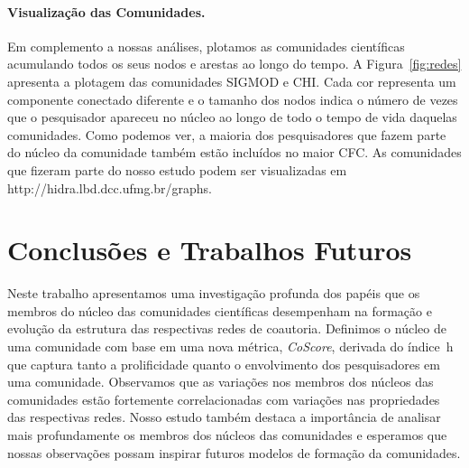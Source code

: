 \documentclass[12pt]{article}
\begin{document}
\paragraph{Visualização das Comunidades.} 
Em complemento a nossas análises, plotamos as comunidades científicas acumulando todos os seus nodos e arestas ao longo 
do tempo. A Figura~\ref{fig:redes} apresenta a plotagem das comunidades SIGMOD e CHI. Cada cor representa um 
componente conectado diferente e o tamanho dos nodos indica o número de vezes que o pesquisador apareceu no núcleo ao 
longo de todo o tempo de vida daquelas comunidades. 
Como podemos ver, a maioria dos pesquisadores que fazem parte do núcleo da
comunidade também estão incluídos no maior CFC.
As comunidades que fizeram parte
do nosso estudo podem ser visualizadas em http://hidra.lbd.dcc.ufmg.br/graphs.


\section{Conclusões e Trabalhos Futuros}

Neste trabalho apresentamos uma investigação profunda dos papéis que os membros do núcleo das 
comunidades científicas desempenham na formação e evolução da estrutura das respectivas redes de coautoria. 
Definimos o núcleo de uma comunidade com
base em uma nova métrica, \textit{CoScore}, derivada do índice~h que captura 
tanto a prolificidade quanto o envolvimento dos pesquisadores em uma comunidade. 
Observamos que as variações nos membros dos núcleos das comunidades estão fortemente correlacionadas 
com variações nas propriedades das respectivas redes. Nosso estudo também destaca a importância de analisar mais profundamente os membros 
dos núcleos das comunidades e esperamos que nossas observações possam inspirar futuros modelos de formação da comunidades.
\end{document}
